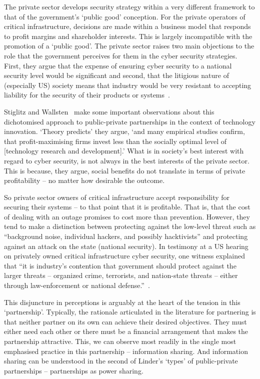 \documentclass[a4paper,11pt]{article}
\begin{document}
The private sector develops security strategy within a very different
framework to that of the government's `public good' conception. For
the private operators of critical infrastructure, decisions are made
within a business model that responds to profit margins and
shareholder interests. This is largely incompatible with the promotion
of a `public good'. The private sector raises two main objections to
the role that the government perceives for them in the cyber security
strategies. First, they argue that the expense of ensuring cyber
security to a national security level would be significant and second,
that the litigious nature of (especially US) society means that
industry would be very resistant to accepting liability for the
security of their products or systems~\cite{paller:2005}.  

Stiglitz and Wallsten~\cite{stiglitz+wallsten:1999} make some
important observations about this dichotomised approach to
public-private partnerships in the context of technology
innovation. `Theory predicts' they argue, `and many empirical studies
confirm, that profit-maximising firms invest less than the socially
optimal level of [technology research and development].' What is in
society’s best interest with regard to cyber security, is not always
in the best interests of the private sector. This is because, they
argue, social benefits do not translate in terms of private
profitability -- no matter how desirable the outcome.

So private sector owners of critical infrastructure accept
responsibility for securing their systems -- to that point that it is
profitable. That is, that the cost of dealing with an outage promises
to cost more than prevention. However, they tend to make a distinction
between protecting against the low-level threat such as ``background
noise, individual hackers, and possibly hacktivists'' and protecting
against an attack on the state (national security). In testimony at a
US hearing on privately owned critical infrastructure cyber security,
one witness explained that ``it is industry’s contention that
government should protect against the larger threats -- organized
crime, terrorists, and nation-state threats -- either through
law-enforcement or national defense.''~\cite{vanardo:2005}.

This disjuncture in perceptions is arguably at the heart of the
tension in this `partnership'. Typically, the rationale articulated in
the literature for partnering is that neither partner on its own can
achieve their desired objectives. They must either need each other or
there must be a financial arrangement that makes the partnership
attractive. This, we can observe most readily in the single most
emphasised practice in this partnership -- information sharing. And
information sharing can be understood in the second of Linder's
`types' of public-private partnerships -- partnerships as power
sharing.
\end{document}
